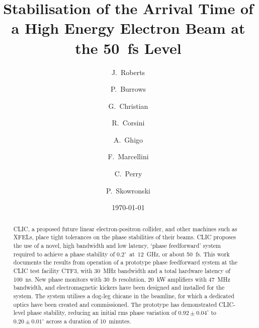 \documentclass[%
 reprint,
superscriptaddress,
 amsmath,amssymb,
 prl,
]{revtex4-1}
\begin{document}

\title{Stabilisation of the Arrival Time of a High Energy Electron Beam at the 
50~fs Level}

\author{J.~Roberts}

\author{P.~Burrows}

\author{G.~Christian}

\author{R.~Corsini}

\author{A.~Ghigo}

\author{F.~Marcellini}

\author{C.~Perry}

\author{P.~Skowronski}

\date{\today}

\begin{abstract}
CLIC, a proposed future linear electron-positron collider, and other machines 
such as XFELs, place tight tolerances on the phase stabilities of their beams. 
CLIC proposes the use of a novel, high bandwidth and low latency, `phase 
feedforward' system required to achieve a phase stability of 
\(0.2^\circ\)~at~12~GHz, or 
about 50~fs. This work documents the results from operation of a prototype 
phase 
feedforward system at the CLIC test facility CTF3, with 30~MHz bandwidth and a 
total hardware latency of 100~ns. New phase monitors with 
30~fs resolution, 20~kW amplifiers with 47~MHz bandwidth, and electromagnetic 
kickers have been designed and installed for the system. The system utilises a 
dog-leg chicane in the beamline, for which a dedicated optics have been created and 
commissioned. The prototype has demonstrated CLIC-level phase stability, 
reducing an initial rms phase variation of \(0.92\pm0.04^\circ\) to 
\(0.20\pm0.01^\circ\) across a duration of 10~minutes.
\end{abstract}

\maketitle
\end{document}

